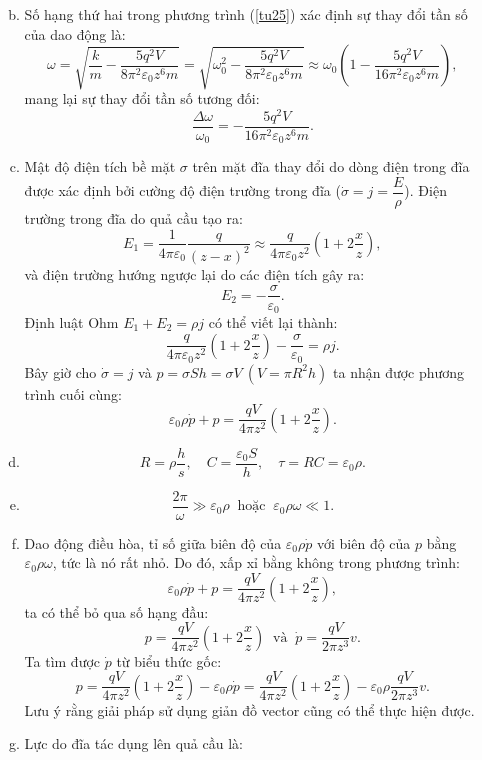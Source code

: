 \begin{loigiai}
\begin{enumerate}[1)]
\begin{enumerate}[a)]
\[\]
\item Số hạng thứ hai trong phương trình (\ref{tu25}) xác định sự thay đổi tần số của dao động là:
\[
\omega=\sqrt{\dfrac{k}{m}-\dfrac{5 q^{2} V}{8 \pi^{2} \varepsilon_{0} z^{6} m}}=\sqrt{\omega_{0}^{2}-\dfrac{5 q^{2} V}{8 \pi^{2} \varepsilon_{0} z^{6} m}} \approx \omega_{0}\left(1-\dfrac{5 q^{2} V}{16 \pi^{2} \varepsilon_{0} z^{6} m}\right), \tag{27}
\]
mang lại sự thay đổi tần số tương đối:
\[
\dfrac{\Delta \omega}{\omega_{0}}=-\dfrac{5 q^{2} V}{16 \pi^{2} \varepsilon_{0} z^{6} m}. \tag{28}
\]
\item Mật độ điện tích bề mặt $\sigma$ trên mặt đĩa thay đổi do dòng điện trong đĩa được xác định bởi cường độ điện trường trong đĩa ($\dot{\sigma}=j=\dfrac{E}{\rho}$). Điện trường trong đĩa do quả cầu tạo ra:
\[
E_{1}=\dfrac{1}{4 \pi \varepsilon_{0}} \dfrac{q}{(z-x)^{2}} \approx \dfrac{q}{4 \pi \varepsilon_{0} z^{2}}\left(1+2 \dfrac{x}{z}\right),
\]
và điện trường hướng ngược lại do các điện tích gây ra:
\[
E_{2}=-\dfrac{\sigma}{\varepsilon_{0}}.
\]
Định luật Ohm $E_1+E_2=\rho j$ có thể viết lại thành:
\[
\dfrac{q}{4 \pi \varepsilon_{0} z^{2}}\left(1+2 \dfrac{x}{z}\right)-\dfrac{\sigma}{\varepsilon_{0}}=\rho j.
\]
Bây giờ cho $\dot{\sigma}=j$ và $p=\sigma S h= \sigma V \ (V=\pi R^2 h)$ ta nhận được phương trình cuối cùng:
\[
\varepsilon_{0} \rho \dot{p}+p=\dfrac{q V}{4 \pi z^{2}}\left(1+2 \dfrac{x}{z}\right).
\]
\item \[
R=\rho \dfrac{h}{s},\quad C=\dfrac{\varepsilon_{0} S}{h},\quad \tau=R C=\varepsilon_{0} \rho.
\]
\item \[
\dfrac{2 \pi}{\omega} \gg \varepsilon_{0} \rho \ \text { hoặc } \  \varepsilon_{0} \rho \omega \ll 1.
\]
\item Dao động điều hòa, tỉ số giữa biên độ của $\varepsilon_{0} \rho \dot{p}$ với biên độ của $p$ bằng $\varepsilon_{0} \rho \omega$, tức là nó rất nhỏ. Do đó, xấp xỉ bằng không trong phương trình:
\[
\varepsilon_{0} \rho \dot{p}+p=\dfrac{q V}{4 \pi z^{2}}\left(1+2 \dfrac{x}{z}\right),
\]
ta có thể bỏ qua số hạng đầu:
\[
p=\dfrac{q V}{4 \pi z^{2}}\left(1+2 \dfrac{x}{z}\right) \ \text { và } \ \dot{p}=\dfrac{q V}{2 \pi z^{3}} v.
\]
Ta tìm được $\dot{p}$ từ biểu thức gốc:
\[
p=\dfrac{q V}{4 \pi z^{2}}\left(1+2 \dfrac{x}{z}\right)-\varepsilon_{0} \rho \dot{p}=\dfrac{q V}{4 \pi z^{2}}\left(1+2 \dfrac{x}{z}\right)-\varepsilon_{0} \rho \dfrac{q V}{2 \pi z^{3}} v.
\]
Lưu ý rằng giải pháp sử dụng giản đồ vector cũng có thể thực hiện được.
\item Lực do đĩa tác dụng lên quả cầu là:
\begin{align*}

\end{align*}
\end{enumerate}
\end{enumerate}
\end{loigiai}
